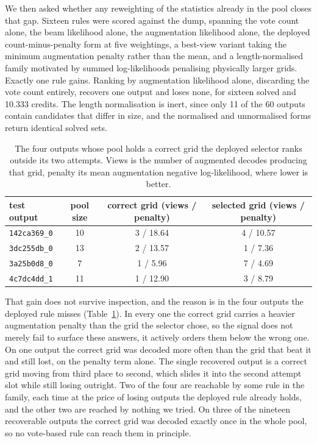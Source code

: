 \documentclass[11pt]{article}
\begin{document}
We then asked whether any reweighting of the statistics already in the pool closes that gap. Sixteen rules
were scored against the dump, spanning the vote count alone, the beam likelihood alone, the augmentation
likelihood alone, the deployed count-minus-penalty form at five weightings, a best-view variant taking the
minimum augmentation penalty rather than the mean, and a length-normalised family motivated by summed
log-likelihoods penalising physically larger grids. Exactly one rule gains. Ranking by augmentation
likelihood alone, discarding the vote count entirely, recovers one output and loses none, for sixteen solved
and 10.333 credits. The length normalisation is inert, since only 11 of the 60 outputs contain candidates
that differ in size, and the normalised and unnormalised forms return identical solved sets.

\begin{table}[H]
\centering
\caption{The four outputs whose pool holds a correct grid the deployed selector ranks outside its two
attempts. Views is the number of augmented decodes producing that grid, penalty its mean augmentation
negative log-likelihood, where lower is better.}
\label{tab:leak}
\begin{tabular}{lccc}
\toprule
test output & pool size & correct grid (views / penalty) & selected grid (views / penalty) \\
\midrule
\texttt{142ca369\_0} & 10 & 3 / 18.64 & 4 / 10.57 \\
\texttt{3dc255db\_0} & 13 & 2 / 13.57 & 1 /\phantom{0} 7.36 \\
\texttt{3a25b0d8\_0} & \phantom{0}7 & 1 /\phantom{0} 5.96 & 7 /\phantom{0} 4.69 \\
\texttt{4c7dc4dd\_1} & 11 & 1 / 12.90 & 3 /\phantom{0} 8.79 \\
\bottomrule
\end{tabular}
\end{table}

That gain does not survive inspection, and the reason is in the four outputs the deployed rule misses
(Table~\ref{tab:leak}). In every one the correct grid carries a heavier augmentation penalty than the grid
the selector chose, so the signal does not merely fail to surface these answers, it actively orders them
below the wrong one. On one output the correct grid was decoded more often than the grid that beat it and
still lost, on the penalty term alone. The single recovered output is a correct grid moving from third place
to second, which slides it into the second attempt slot while still losing outright. Two of the four are
reachable by some rule in the family, each time at the price of losing outputs the deployed rule already
holds, and the other two are reached by nothing we tried. On three of the nineteen recoverable outputs the
correct grid was decoded exactly once in the whole pool, so no vote-based rule can reach them in principle.
\end{document}

